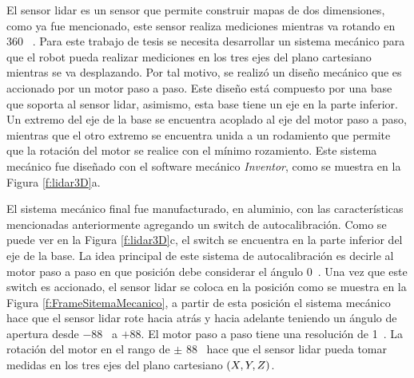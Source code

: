 
El sensor lidar es un sensor que permite construir mapas de dos dimensiones, como ya 
fue mencionado, este sensor realiza mediciones mientras va rotando en 360 \grad~. Para 
este trabajo de tesis se necesita desarrollar un sistema mecánico para que el robot 
pueda realizar mediciones en los tres ejes del plano cartesiano mientras se va 
desplazando. Por tal motivo, se realizó un diseño mecánico que es accionado por un motor
paso a paso. Este diseño está compuesto por una base que soporta al sensor lidar, asimismo, 
esta base tiene un eje en la parte inferior. Un extremo del eje de la base se encuentra 
acoplado al eje del motor paso a paso, mientras que el otro extremo se encuentra unida 
a un rodamiento que permite que la rotación del motor se realice con el mínimo rozamiento. Este
sistema mecánico fue diseñado con el software mecánico \textit{Inventor}, como se muestra
en la Figura \ref{f:lidar3D}a.

El sistema mecánico final fue manufacturado, en aluminio, con las características mencionadas
anteriormente agregando un switch de autocalibración. Como se puede ver en la Figura 
\ref{f:lidar3D}c, el switch se encuentra en la parte inferior del eje de la base. La idea 
principal de este sistema de autocalibración es decirle al motor paso a paso en que posición 
debe considerar el ángulo 0\grad~. Una vez que este switch es accionado, el sensor lidar se 
coloca en la posición como se muestra en la Figura \ref{f:FrameSitemaMecanico}, a partir de esta 
posición el sistema mecánico hace que el sensor lidar rote hacia atrás y hacia adelante teniendo 
un ángulo de apertura desde $-88$\grad~ a $+88$\grad. El motor paso a paso tiene una resolución
de 1\grad~. La rotación del motor en el rango de $\pm$ 88\grad~ hace que el sensor lidar pueda 
tomar medidas en los tres ejes del plano cartesiano $(\mathnormal X,\mathnormal Y,\mathnormal Z)$.

